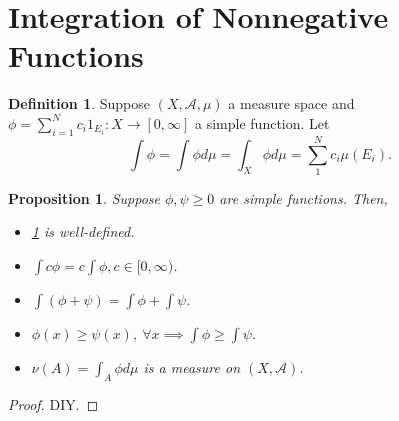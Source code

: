 \documentclass{report}
\newcommand{\cA}{\mathcal{A}}
\newtheorem{proposition}[theorem]{Proposition}
\theoremstyle{definition}
\newtheorem{definition}[theorem]{Definition}
\theoremstyle{remark}
\begin{document}
\section{Integration of Nonnegative Functions}
\begin{definition}\label{def:nonneg}
	Suppose $(X, \cA, \mu)$ a measure space and $\phi = \sum_{i=1}^N c_i1_{E_i}: X \to [0, \infty]$ a simple function.
	Let \[
		\int \phi = \int \phi d\mu = \int_X \phi d\mu = \sum_1^N c_i\mu(E_i).	
	\]
\end{definition}

\begin{proposition}
	Suppose $\phi, \psi \geq 0$ are simple functions. Then, 
	\begin{itemize}
		\item \ref{def:nonneg} is well-defined.
		\item $\displaystyle \int c\phi = c \int \phi, c \in [0, \infty)$.
		\item $\displaystyle \int (\phi + \psi) = \int \phi + \int \psi$.
		\item $\displaystyle \phi(x) \geq \psi(x),\ \forall x \implies \int \phi \geq \int \psi$.
		\item $\displaystyle \nu(A) = \int_A \phi d \mu$ is a measure on $(X, \cA)$.
	\end{itemize}
\end{proposition}
\begin{proof}
	DIY.
\end{proof}
\end{document}
